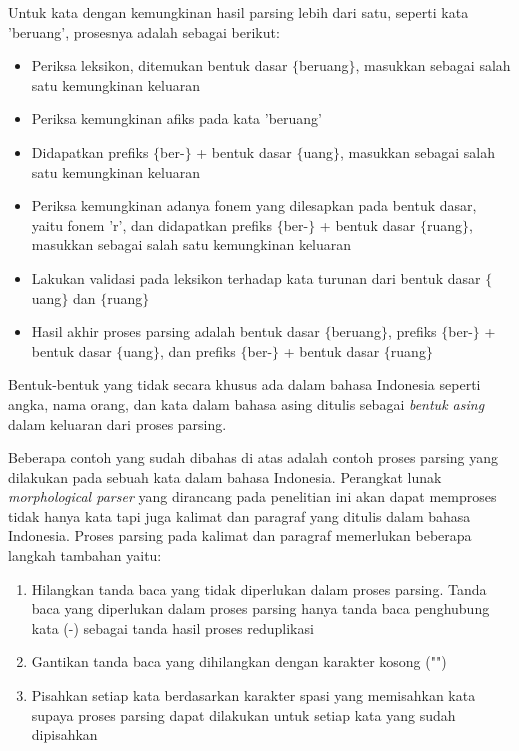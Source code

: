 Untuk kata dengan kemungkinan hasil parsing lebih dari satu, seperti kata 'beruang', prosesnya adalah sebagai berikut:
\begin{itemize}
	\item Periksa leksikon, ditemukan bentuk dasar $\lbrace$beruang$\rbrace$, masukkan sebagai salah satu kemungkinan keluaran
	\item Periksa kemungkinan afiks pada kata 'beruang'
	\item Didapatkan prefiks $\lbrace$ber-$\rbrace$ + bentuk dasar $\lbrace$uang$\rbrace$, masukkan sebagai salah satu kemungkinan keluaran
	\item Periksa kemungkinan adanya fonem yang dilesapkan pada bentuk dasar, yaitu fonem 'r', dan didapatkan prefiks $\lbrace$ber-$\rbrace$ + bentuk dasar $\lbrace$ruang$\rbrace$, masukkan sebagai salah satu kemungkinan keluaran
	\item Lakukan validasi pada leksikon terhadap kata turunan dari bentuk dasar $\lbrace$uang$\rbrace$ dan $\lbrace$ruang$\rbrace$
	\item Hasil akhir proses parsing adalah bentuk dasar $\lbrace$beruang$\rbrace$, prefiks $\lbrace$ber-$\rbrace$ + bentuk dasar $\lbrace$uang$\rbrace$, dan prefiks $\lbrace$ber-$\rbrace$ + bentuk dasar $\lbrace$ruang$\rbrace$
\end{itemize}

Bentuk-bentuk yang tidak secara khusus ada dalam bahasa Indonesia seperti angka, nama orang, dan kata dalam bahasa asing ditulis sebagai \textit{bentuk asing} dalam keluaran dari proses parsing.

Beberapa contoh yang sudah dibahas di atas adalah contoh proses parsing yang dilakukan pada sebuah kata dalam bahasa Indonesia. Perangkat lunak \textit{morphological parser} yang dirancang pada penelitian ini akan dapat memproses tidak hanya kata tapi juga kalimat dan paragraf yang ditulis dalam bahasa Indonesia. Proses parsing pada kalimat dan paragraf memerlukan beberapa langkah tambahan yaitu:

\begin{enumerate}
	\item Hilangkan tanda baca yang tidak diperlukan dalam proses parsing. Tanda baca yang diperlukan dalam proses parsing hanya tanda baca penghubung kata (-) sebagai tanda hasil proses reduplikasi
	\item Gantikan tanda baca yang dihilangkan dengan karakter kosong ("")
	\item Pisahkan setiap kata berdasarkan karakter spasi yang memisahkan kata supaya proses parsing dapat dilakukan untuk setiap kata yang sudah dipisahkan
\end{enumerate}


